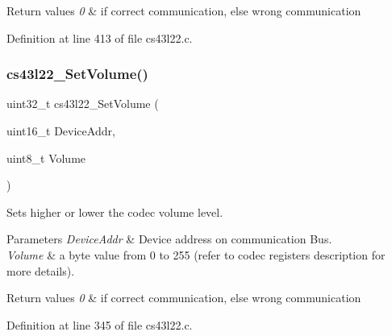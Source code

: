 \begin{DoxyRetVals}{Return values}
{\em 0} & if correct communication, else wrong communication \\
\hline
\end{DoxyRetVals}


Definition at line 413 of file cs43l22.\+c.

\mbox{\label{group___c_s43_l22___private___functions_ga9cd060bb226e44065ec50c7803041114}} 
\subsubsection{\texorpdfstring{cs43l22\+\_\+\+Set\+Volume()}{cs43l22\_SetVolume()}}
{\footnotesize\ttfamily uint32\+\_\+t cs43l22\+\_\+\+Set\+Volume (\begin{DoxyParamCaption}\item[{uint16\+\_\+t}]{Device\+Addr,  }\item[{uint8\+\_\+t}]{Volume }\end{DoxyParamCaption})}



Sets higher or lower the codec volume level. 


\begin{DoxyParams}{Parameters}
{\em Device\+Addr} & Device address on communication Bus. ~\newline
\\
\hline
{\em Volume} & a byte value from 0 to 255 (refer to codec registers description for more details). \\
\hline
\end{DoxyParams}

\begin{DoxyRetVals}{Return values}
{\em 0} & if correct communication, else wrong communication \\
\hline
\end{DoxyRetVals}


Definition at line 345 of file cs43l22.\+c.

\mbox{\label{group___c_s43_l22___private___functions_gabddd9aca1e7c5cdf636556cc02b4d82e}} 
